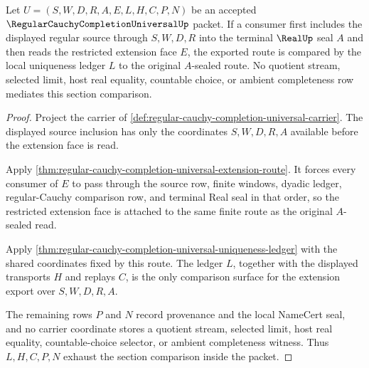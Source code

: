 \begin{theorem}
\label{thm:regular-cauchy-completion-universal-section}
Let $U=(S,W,D,R,A,E,L,H,C,P,N)$ be an accepted $\RegularCauchyCompletionUniversalUp$ packet. If a consumer first includes the displayed regular source through $S,W,D,R$ into the terminal $\RealUp$ seal $A$ and then reads the restricted extension face $E$, the exported route is compared by the local uniqueness ledger $L$ to the original $A$-sealed route. No quotient stream, selected limit, host real equality, countable choice, or ambient completeness row mediates this section comparison.
\end{theorem}
\begin{proof}
Project the carrier of \autoref{def:regular-cauchy-completion-universal-carrier}. The displayed source inclusion has only the coordinates $S,W,D,R,A$ available before the extension face is read.

Apply \autoref{thm:regular-cauchy-completion-universal-extension-route}. It forces every consumer of $E$ to pass through the source row, finite windows, dyadic ledger, regular-Cauchy comparison row, and terminal Real seal in that order, so the restricted extension face is attached to the same finite route as the original $A$-sealed read.

Apply \autoref{thm:regular-cauchy-completion-universal-uniqueness-ledger} with the shared coordinates fixed by this route. The ledger $L$, together with the displayed transports $H$ and replays $C$, is the only comparison surface for the extension export over $S,W,D,R,A$.

The remaining rows $P$ and $N$ record provenance and the local NameCert seal, and no carrier coordinate stores a quotient stream, selected limit, host real equality, countable-choice selector, or ambient completeness witness. Thus $L,H,C,P,N$ exhaust the section comparison inside the packet.
\end{proof}

